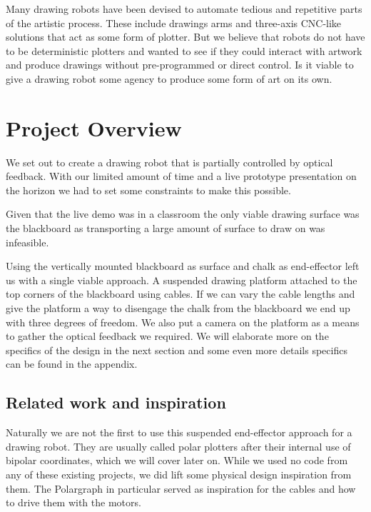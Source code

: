 \documentclass[12pt]{article}
\begin{document}
Many drawing robots have been devised to automate tedious and
repetitive parts of the artistic process.
These include drawings arms and three-axis CNC-like solutions that
act as some form of plotter.
But we believe that robots do not have to be deterministic plotters
and wanted to see if they could interact with artwork and produce
drawings without pre-programmed or direct control.
Is it viable to give a drawing robot some agency to produce some
form of art on its own.

\section{Project Overview}
\label{sec:overview}

We set out to create a drawing robot that is partially controlled by
optical feedback.
With our limited amount of time and a live prototype presentation
on the horizon we had to set some constraints to make this possible.

Given that the live demo was in a classroom the only viable drawing
surface was the blackboard as transporting a large amount of surface
to draw on was infeasible.

Using the vertically mounted blackboard as surface and chalk as
end-effector left us with a single viable approach.
A suspended drawing platform attached to the top corners of the
blackboard using cables.
If we can vary the cable lengths and give the platform a way to
disengage the chalk from the blackboard we end up with three
degrees of freedom.
We also put a camera on the platform as a means to gather the
optical feedback we required.
We will elaborate more on the specifics of the design in the next
section and some even more details specifics can be found in the
appendix.

\subsection*{Related work and inspiration}
Naturally we are not the first to use this suspended end-effector
approach for a drawing robot.
They are usually called polar plotters after their internal use
of bipolar coordinates, which we will cover later on.
While we used no code from any of these existing projects, we did
lift some physical design inspiration from them.
The Polargraph \cite{polargraphsite} in particular served as
inspiration for the cables and how to drive them with the motors.
\end{document}
